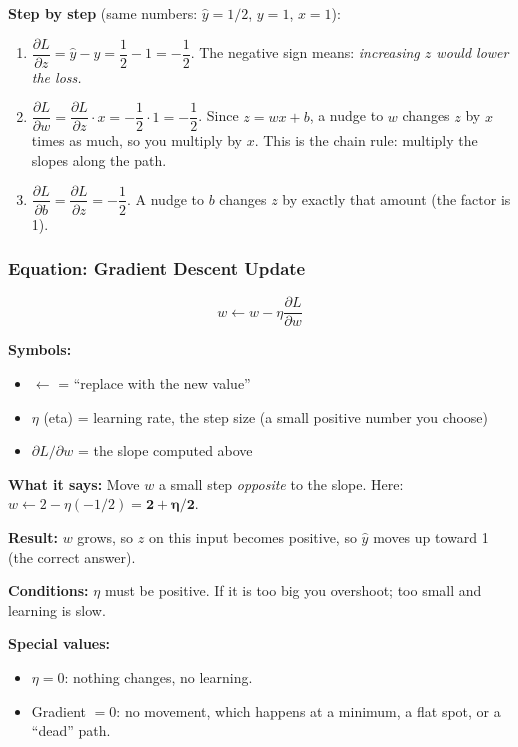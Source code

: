 \textbf{Step by step} (same numbers: $\hat{y} = 1/2$, $y = 1$, $x = 1$):
\begin{enumerate}
  \item $\dfrac{\partial L}{\partial z} = \hat{y} - y = \dfrac{1}{2} - 1 = -\dfrac{1}{2}$. The negative sign means: \emph{increasing $z$ would lower the loss.}
  \item $\dfrac{\partial L}{\partial w} = \dfrac{\partial L}{\partial z}\cdot x = -\dfrac{1}{2}\cdot 1 = -\dfrac{1}{2}$. Since $z = wx + b$, a nudge to $w$ changes $z$ by $x$ times as much, so you multiply by $x$. This is the chain rule: multiply the slopes along the path.
  \item $\dfrac{\partial L}{\partial b} = \dfrac{\partial L}{\partial z} = -\dfrac{1}{2}$. A nudge to $b$ changes $z$ by exactly that amount (the factor is 1).
\end{enumerate}

\subsubsection*{Equation: Gradient Descent Update}

\[
w \leftarrow w - \eta \frac{\partial L}{\partial w}
\]

\textbf{Symbols:}
\begin{itemize}
  \item $\leftarrow$ = ``replace with the new value''
  \item $\eta$ (eta) = learning rate, the step size (a small positive number you choose)
  \item $\partial L / \partial w$ = the slope computed above
\end{itemize}

\textbf{What it says:} Move $w$ a small step \emph{opposite} to the slope. Here: $w \leftarrow 2 - \eta(-1/2) = \mathbf{2 + \eta/2}$.

\textbf{Result:} $w$ grows, so $z$ on this input becomes positive, so $\hat{y}$ moves up toward 1 (the correct answer).

\textbf{Conditions:} $\eta$ must be positive. If it is too big you overshoot; too small and learning is slow.

\textbf{Special values:}
\begin{itemize}
  \item $\eta = 0$: nothing changes, no learning.
  \item Gradient $= 0$: no movement, which happens at a minimum, a flat spot, or a ``dead'' path.
\end{itemize}

